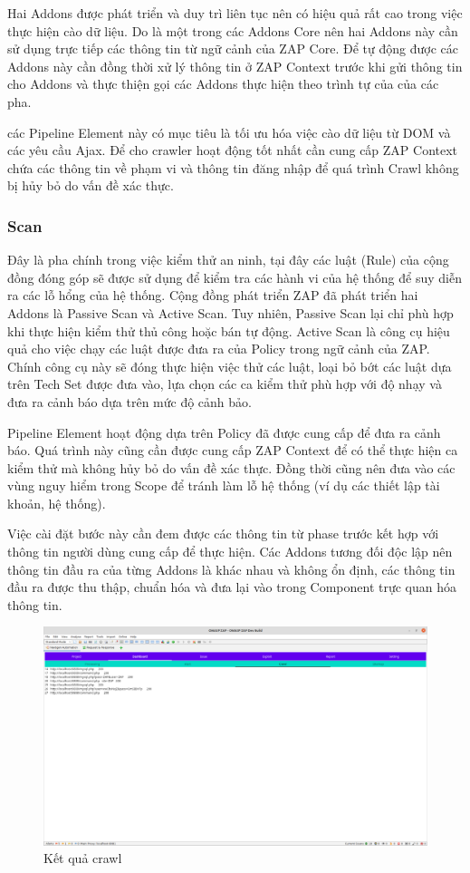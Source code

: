 \documentclass[./../main.tex]{subfiles}
\begin{document}
Hai Addons được phát triển và duy trì liên tục nên có hiệu quả rất cao
trong việc thực hiện cào dữ liệu. Do là một trong các Addons Core nên hai
Addons này cần sử dụng trực tiếp các thông tin từ ngữ cảnh của ZAP Core.
Để tự động được các Addons này cần đồng thời xử lý thông tin ở ZAP Context
trước khi gửi thông tin cho Addons và thực thiện gọi các Addons thực hiện
theo trình tự của của các pha.

các Pipeline Element này có mục tiêu là tối ưu hóa việc cào dữ liệu từ
DOM và các yêu cầu Ajax. Để cho crawler hoạt động tốt nhất cần cung cấp
ZAP Context chứa các thông tin về phạm vi và thông tin đăng nhập để quá
trình Crawl không bị hủy bỏ do vấn đề xác thực.
\subsubsection{Scan}

Đây là pha chính trong việc kiểm thử an ninh, tại đây các luật (Rule)
của cộng đồng đóng góp sẽ được sử dụng để kiểm tra các hành vi của hệ
thống để suy diễn ra các lỗ hổng của hệ thống. Cộng đồng phát triển ZAP
đã phát triển hai Addons là Passive Scan và Active Scan. Tuy nhiên,
Passive Scan lại chỉ phù hợp khi thực hiện kiểm thử thủ công hoặc bán
tự động. Active Scan là công cụ hiệu quả cho việc chạy các luật được
đưa ra của Policy trong ngữ cảnh của ZAP. Chính công cụ này sẽ đóng
thực hiện việc thử các luật, loại bỏ bớt các luật dựa trên Tech Set
được đưa vào, lựa chọn các ca kiểm thử phù hợp với độ nhạy và đưa ra
cảnh báo dựa trên mức độ cảnh bảo.

Pipeline Element hoạt động dựa trên Policy đã được cung cấp để đưa ra
cảnh báo. Quá trình này cũng cần được cung cấp ZAP Context để có thể thực
hiện ca kiểm thử mà không hủy bỏ do vấn đề xác thực. Đồng thời cũng nên đưa
vào các vùng nguy hiểm trong Scope để tránh làm lỗ hệ thống (ví dụ các
thiết lập tài khoản, hệ thống).

Việc cài đặt bước này cần đem được các thông tin từ phase trước kết hợp
với thông tin người dùng cung cấp để thực hiện. Các Addons tương đối độc
lập nên thông tin đầu ra của từng Addons là khác nhau và không ổn định,
các thông tin đầu ra được thu thập, chuẩn hóa và đưa lại vào trong
Component trực quan hóa thông tin.

\begin{figure}[H]
	\includegraphics[width=\linewidth]{./images/scan_result.png}
	\caption{Kết quả crawl}
	\label{fig:scan_result}
\end{figure}
\end{document}
